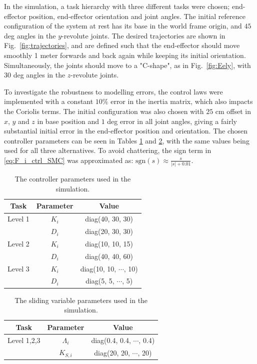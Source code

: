 \documentclass[../main.tex]{subfiles}
\begin{document}
In the simulation, a task hierarchy with three different tasks were chosen; end-effector position, end-effector orientation and joint angles. The initial reference configuration of the system at rest has its base in the world frame origin, and $45$ deg angles in the  $y$-revolute joints. The desired trajectories are shown in Fig.~\ref{fig:trajectories}, and are defined such that the end-effector should move smoothly 1 meter forwards and back again while keeping its initial orientation. Simultaneously, the joints should move to a "C-shape", as in Fig.~\ref{fig:Eely}, with $30$ deg angles in the $z$-revolute joints.

To investigate the robustness to modelling errors, the control laws were implemented with a constant $10\%$ error in the inertia matrix, which also impacts the Coriolis terms. The initial configuration was also chosen with $25$ cm offset in $x$, $y$ and $z$ in base position and $1$ deg error in all joint angles, giving a fairly substantial initial error in the end-effector position and orientation. The chosen controller parameters can be seen in Tables \ref{tab:tuning_params} and \ref{tab:tuning_params_sliding}, with the same values being used for all three alternatives. To avoid chattering, the sign term in \eqref{eq:F_i_ctrl_SMC} was approximated as: $\text{sgn}(s) \approx \frac{s}{|s| + 0.01}$.

\begin{table}[thpb]
    \caption{The controller parameters used in the simulation.}
    \centering
    \label{tab:tuning_params}
    \begin{tabular}{|c|c|c|}
    \hline

    Task & Parameter & Value \\
    \hline
    Level 1 & $K_i$ & diag(40, 30, 30) \\
    & $D_i$ & diag(20, 30, 30)  \\
    \hline

    Level 2 & $K_i$ & diag(10, 10, 15) \\
    & $D_i$ & diag(40, 40, 60)  \\
    \hline

    Level 3 & $K_i$ & diag(10, 10, $\dotsi$, 10) \\
    & $D_i$ & diag(5, 5, $\dotsi$, 5)  \\
    \hline
    \end{tabular}
\end{table}
\setlength\intextsep{0pt}
\begin{table}[htb]
    \caption{The sliding variable parameters used in the simulation.}
    \centering
    \label{tab:tuning_params_sliding}
    \begin{tabular}{|c|c|c|}
        \hline
        Task & Parameter & Value \\
        \hline
        Level 1,2,3 & $\Lambda_i$ & diag(0.4, 0.4, $\dotsi$, 0.4) \\
        & $K_{S,i}$ & diag(20, 20, $\dotsi$, 20) \\
        \hline
    \end{tabular}
\end{table}
\end{document}
